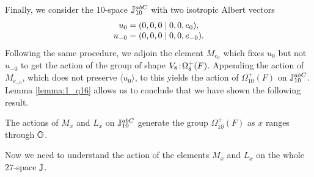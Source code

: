 Finally, we consider the $10$-space $\mathbb{J}_{10}^{abC}$ with two isotropic Albert vectors
\begin{equation}
	\begin{array}{r@{\;}c@{\;}l}
		u_0 & = & (0,0,0\mid 0,0,e_0), \\
		u_{-0} & = & (0,0,0\mid 0,0,e_{-0}).
	\end{array}
\end{equation}
Following the same procedure, we adjoin the element $M_{e_0}$ which fixes $u_0$ but not 
$u_{-0}$ to get the action of the group of shape $V_8\mathord{{\;\!{:}\;\!}}\Omega_8^+(F)$. 
Appending the action of $M_{e_{-0}}$, which does not preserve $\langle u_0 \rangle$, to
this yields the action of $\Omega_{10}^+(F)$ on $\mathbb{J}_{10}^{abC}$. 
Lemma \ref{lemma:1_q16} allows us to conclude that we have shown the following result.

\begin{lemma}
	\label{lemma:1_omega10plus}
	The actions of $M_x$ and $L_x$ on $\mathbb{J}_{10}^{abC}$ generate the 
	group $\Omega_{10}^+(F)$ as $x$ ranges through $\mathbb{O}$. 
\end{lemma}

Now we need to understand the action of the elements $M_x$ and $L_x$ on the whole 
$27$-space $\mathbb{J}$.  

